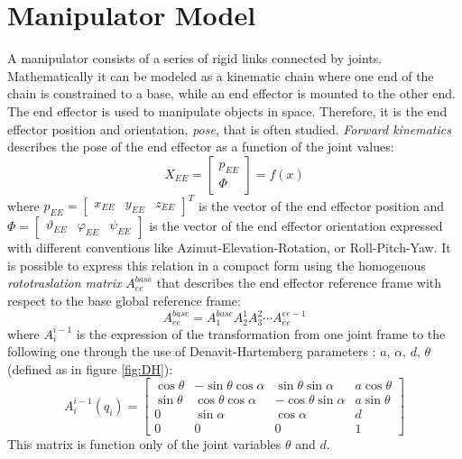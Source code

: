 \section{Manipulator Model}
A manipulator consists of a series of rigid links connected by joints. Mathematically it can be modeled as a kinematic chain where one end of the chain is constrained to a base, while an end effector is mounted to the other end. The end effector is used to manipulate objects in space. Therefore, it is the end effector position and orientation, \textit{pose}, that is often studied. \textit{Forward kinematics} describes the pose of the end effector as a function of the joint values:
\begin{equation}
 	X_{EE}=\left[\begin{matrix}p_{EE}\\\Phi\end{matrix}\right]=f(x)
\end{equation} 
where $p_{EE}=\left[\begin{matrix}x_{EE}&y_{EE}&z_{EE}\end{matrix}\right]^T$ is the vector of the end effector position and $\Phi =\left[\begin{matrix}\vartheta_{EE}&\varphi_{EE}&\psi_{EE}\end{matrix}\right]$ is the vector of the end effector orientation expressed with different conventions like Azimut-Elevation-Rotation, or Roll-Pitch-Yaw. 
It is possible to express this relation in a compact form using the homogenous \textit{rototraslation matrix} $A_{ee}^{base}$ that describes the end effector reference frame with respect to the base global reference frame:
\begin{equation}\label{AAAA_man}
A_{ee}^{base}=A_1^{base}A_2^1A_3^2\cdots A_{ee}^{ee-1}
\end{equation}
where $A_i^{i-1}$ is the expression of the transformation from one joint frame to the following one through the use of Denavit-Hartemberg parameters \cite{DH}: $a\text{, }\alpha\text{, }d\text{, }\theta$ (defined as in figure \ref{fig:DH}):
\begin{equation}
A_i^{i-1}(q_i)=\left[
\begin{matrix}
\cos\theta & -\sin\theta\cos\alpha & \sin\theta\sin\alpha & a\cos\theta \\
\sin\theta & \cos\theta\cos\alpha & -\cos\theta\sin\alpha & a\sin\theta \\
0 & \sin\alpha & \cos\alpha & d \\
0 & 0 & 0 & 1
\end{matrix}
\right]
\end{equation}
This matrix is function only of the joint variables $\theta$ and $d$.

